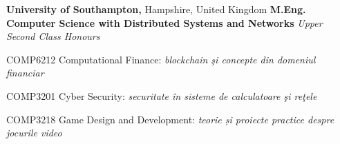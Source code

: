
\smallskip
{}%
\textbf{University of Southampton,} Hampshire, United Kingdom \newline
\textbf{M.Eng. Computer Science with Distributed Systems and Networks} \newline
\emph{Upper Second Class Honours} 
\begin{itemize*}
  \item COMP6212 Computational Finance: \emph{blockchain şi concepte din domeniul financiar}
  \item COMP3201 Cyber Security: \emph{securitate în sisteme de calculatoare şi reţele}
  \item COMP3218 Game Design and Development: \emph{teorie și proiecte practice despre jocurile video}
\end{itemize*}

